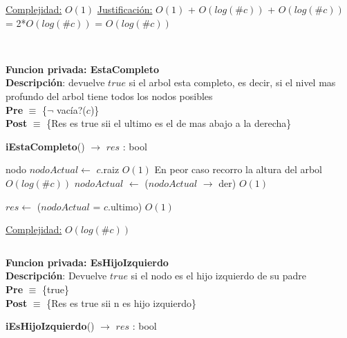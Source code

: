 \begin{Algoritmos}
\begin{algorithm}[H]
\begin{algorithmic}[1]
    \medskip
    \Statex \underline{Complejidad:} $O(1)$
    \Statex \underline{Justificaci\'on:} $O(1)$ + $O(log(\#c))$ + $O(log(\#c))$ = 2*$O(log(\#c))$ = $O(log(\#c))$
\end{algorithmic}
\end{algorithm}






$ $\newline
$ $\newline

\textbf{Funcion privada: EstaCompleto}\\
\textbf{Descripci\'on}: devuelve $true$ si el arbol esta completo, es decir, si el nivel mas profundo del arbol tiene todos los nodos posibles\\
\textbf{Pre} $\equiv$ \{$\neg$ vac\'ia?($c$)\}\\%
\textbf{Post} $\equiv$ \{Res es true sii el ultimo es el de mas abajo a la derecha\}%
\begin{algorithm}[H]
{\textbf{iEstaCompleto}() $\to$ $res$ : bool}
\begin{algorithmic}[1]

    \State nodo $nodoActual \gets$ $c$.raiz \Comment $O(1)$
     \Comment En peor caso recorro la altura del arbol $O(log(\#c))$
        \State $nodoActual$ $\gets$ ($nodoActual$ $\rightarrow$ der) \Comment $O(1)$
    \EndWhile

    \State $res \gets$ ($nodoActual$ = $c$.ultimo) $O(1)$

    \medskip
    \Statex \underline{Complejidad:} $O(log(\#c))$
\end{algorithmic}
\end{algorithm}


$ $\newline

\textbf{Funcion privada: EsHijoIzquierdo}\\
\textbf{Descripci\'on}: Devuelve $true$ si el nodo es el hijo izquierdo de su padre\\
\textbf{Pre} $\equiv$ \{true\}\\%
\textbf{Post} $\equiv$ \{Res es true sii n es hijo izquierdo\}%
\begin{algorithm}[H]
{\textbf{iEsHijoIzquierdo}() $\to$ $res$ : bool}
\begin{algorithmic}[1]
    

\end{algorithmic}
\end{algorithm}
\end{Algoritmos}
